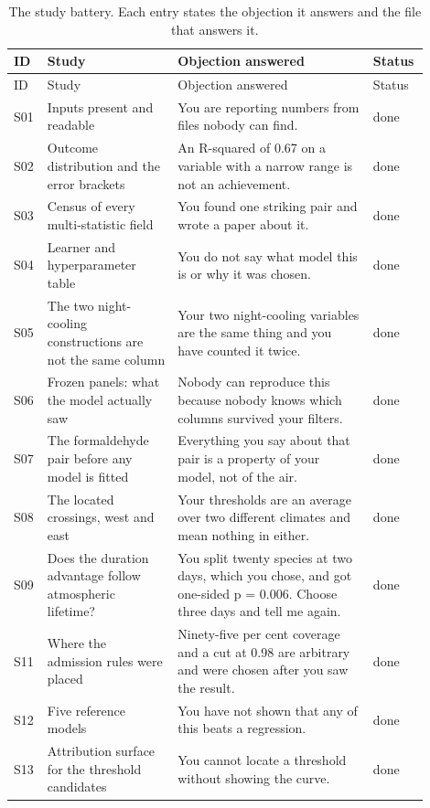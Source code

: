 \begin{longtable}{p{0.05\linewidth}p{0.30\linewidth}p{0.45\linewidth}p{0.10\linewidth}}
\caption{The study battery. Each entry states the objection it answers and the file that answers it.}\label{tab:battery}\\
\toprule
 ID & Study & Objection answered & Status \\
\midrule
\endfirsthead
\toprule
 ID & Study & Objection answered & Status \\
\midrule
\endhead
 S01 & Inputs present and readable & You are reporting numbers from files nobody can find. & done \\
 S02 & Outcome distribution and the error brackets & An R-squared of 0.67 on a variable with a narrow range is not an achievement. & done \\
 S03 & Census of every multi-statistic field & You found one striking pair and wrote a paper about it. & done \\
 S04 & Learner and hyperparameter table & You do not say what model this is or why it was chosen. & done \\
 S05 & The two night-cooling constructions are not the same column & Your two night-cooling variables are the same thing and you have counted it twice. & done \\
 S06 & Frozen panels: what the model actually saw & Nobody can reproduce this because nobody knows which columns survived your filters. & done \\
 S07 & The formaldehyde pair before any model is fitted & Everything you say about that pair is a property of your model, not of the air. & done \\
 S08 & The located crossings, west and east & Your thresholds are an average over two different climates and mean nothing in either. & done \\
 S09 & Does the duration advantage follow atmospheric lifetime? & You split twenty species at two days, which you chose, and got one-sided p = 0.006. Choose three days and tell me again. & done \\
 S11 & Where the admission rules were placed & Ninety-five per cent coverage and a cut at 0.98 are arbitrary and were chosen after you saw the result. & done \\
 S12 & Five reference models & You have not shown that any of this beats a regression. & done \\
 S13 & Attribution surface for the threshold candidates & You cannot locate a threshold without showing the curve. & done \\

\end{longtable}
